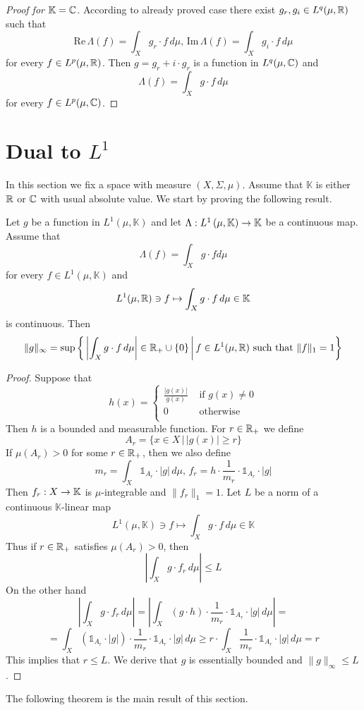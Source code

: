 \begin{proof}[Proof for $\mathbb{K} = {\mathbb C}$]
According to already proved case there exist $g_r,g_i\in L^q(\mu,{\mathbb R})$ such that
$$\mathrm{Re}\,\Lambda(f) = \int_X g_r\cdot f\,d\mu,\,\mathrm{Im}\,\Lambda(f) = \int_Xg_i\cdot f\,d\mu$$
for every $f \in L^p(\mu,{\mathbb R})$. Then $g = g_r + i\cdot g_r$ is a function in $L^q(\mu,{\mathbb C})$ and 
$$\Lambda(f) = \int_Xg\cdot f\,d\mu$$
for every $f \in L^p(\mu,{\mathbb C})$.
\end{proof}

\section{Dual to $L^1$}
\noindent
In this section we fix a space with measure $(X,\Sigma,\mu)$. Assume that $\mathbb{K}$ is either ${\mathbb R}$ or ${\mathbb C}$ with usual absolute value. We start by proving the following result.

\begin{proposition}\label{proposition:norm_of_standard_functional_for_infinity}
Let $g$ be a function in $L^1(\mu,\mathbb{K})$ and let $\Lambda:L^1\left(\mu,\mathbb{K}\right)\rightarrow \mathbb{K}$ be a continuous map. Assume that
$$\Lambda(f) = \int_Xg\cdot f d\mu$$
for every $f \in L^1(\mu,\mathbb{K})$ and
$$L^1(\mu,{\mathbb R})\ni f \mapsto \int_Xg\cdot f\,d\mu\in \mathbb{K}$$
is continuous. Then 
$$\lVert g\rVert_{\infty} = \sup \bigg\{\left|\int_X g\cdot f\,d\mu\right|\in {\mathbb R}_+\cup \{0\}\,\bigg|\,f\in L^1(\mu,{\mathbb R})\mbox{ such that }\lVert f\rVert_1 = 1\bigg\}$$
\end{proposition}
\begin{proof}
Suppose that
$$h(x) = \begin{cases}
\frac{|g(x)|}{g(x)}&\mbox{ if }g(x) \neq 0\\
0&\mbox{ otherwise}\\
\end{cases}
$$
Then $h$ is a bounded and measurable function. For $r \in {\mathbb R}_+$ we define
$$A_{r} = \big\{x\in X\,\big|\,|g(x)| \geq r \big\}$$
If $\mu(A_r) > 0$ for some $r\in {\mathbb R}_+$, then we also define
$$m_r = \int_X\mathbb{1}_{A_r}\cdot |g|\,d\mu,\,f_r = h\cdot \frac{1}{m_r}\cdot \mathbb{1}_{A_{r}}\cdot |g|$$
Then $f_r:X\rightarrow \mathbb{K}$ is $\mu$-integrable and $\lVert f_r\rVert_1 = 1$. Let $L$ be a norm of a continuous $\mathbb{K}$-linear map
$$L^1(\mu,\mathbb{K})\ni f \mapsto \int_Xg\cdot f\,d\mu\in \mathbb{K}$$
Thus if $r \in {\mathbb R}_+$ satisfies $\mu(A_r) > 0$, then
$$\left| \int_Xg\cdot f_r\,d\mu\right| \leq L$$
On the other hand
$$\left| \int_Xg\cdot f_r\,d\mu\right| = \left|\int_X \left(g\cdot h\right) \cdot \frac{1}{m_r}\cdot \mathbb{1}_{A_r}\cdot |g|\,d\mu\right| = $$
$$= \int_X \left(\mathbb{1}_{A_r}\cdot |g|\right) \cdot \frac{1}{m_r}\cdot \mathbb{1}_{A_r}\cdot |g|\,d\mu \geq r\cdot \int_X\frac{1}{m_r}\cdot \mathbb{1}_{A_r}\cdot |g|\,d\mu = r$$
This implies that $r \leq L$. We derive that $g$ is essentially bounded and $\lVert g\rVert_{\infty} \leq L$.
\end{proof}
\noindent
The following theorem is the main result of this section.

